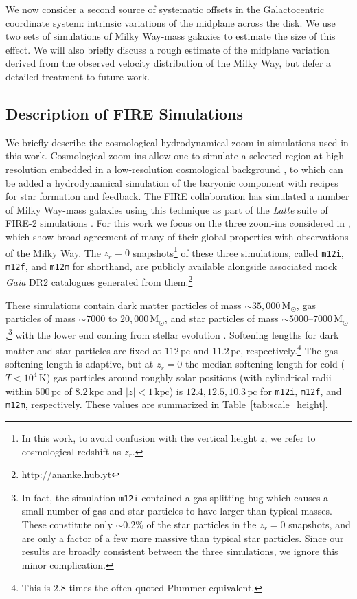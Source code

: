 \documentclass[twocolumn]{aastex62}
\newcommand{\Msun}{\ensuremath{\text{M}_\odot}}
\newcommand{\pc}{\text{pc}}
\newcommand{\kpc}{\text{kpc}}
\newcommand{\mi}{\texttt{m12i}}
\newcommand{\mf}{\texttt{m12f}}
\newcommand{\mm}{\texttt{m12m}}
\newcommand{\abs}[1]{\left| #1 \right|}
\newcommand{\z}{z_r}
\begin{document}
We now consider a second source of systematic offsets in the Galactocentric
coordinate system: intrinsic variations of the midplane across the disk. We
use two sets of simulations of Milky Way-mass galaxies to estimate the size of this effect. We will also
briefly discuss a rough estimate of the midplane variation derived from the
observed velocity distribution of the Milky Way, but defer a detailed
treatment to future work.

\subsection{Description of FIRE Simulations} \label{ssec:cosmozoom}
We briefly describe the cosmological-hydrodynamical zoom-in simulations used
in this work. Cosmological zoom-ins allow one to simulate a selected region at
high resolution embedded in a low-resolution cosmological background
\citep[e.g.][]{1993ApJ...412..455K,2014MNRAS.437.1894O}, to which can be added
a hydrodynamical simulation of the baryonic component with recipes for star
formation and feedback. The FIRE collaboration has simulated a number of Milky
Way-mass galaxies using this technique as part of the {\em Latte} suite of
FIRE-2 simulations \citep{2016ApJ...827L..23W,2018MNRAS.481.4133G}. For this
work we focus on the three zoom-ins considered in \citet{2018arXiv180610564S},
which show broad agreement of many of their global properties with
observations of the Milky Way. The $\z=0$ snapshots\footnote{In this work, to
avoid confusion with the vertical height $z$, we refer to cosmological
redshift as $\z$.} of these three simulations, called \mi{}, \mf{}, and \mm{}
for shorthand, are publicly available alongside associated mock {\em Gaia} DR2
catalogues generated from them.\footnote{\url{http://ananke.hub.yt}}

These simulations contain dark matter particles of mass $\sim35,000\,\Msun$,
gas particles of mass $\sim 7000$ to $20,000\,\Msun$, and star particles
of mass $\sim 5000 \text{--} 7000\,
\Msun$,\footnote{In fact, the simulation \mi{} contained a gas
splitting bug which causes a small number of gas and star particles to have
larger than typical masses. These constitute only $\sim0.2\%$ of the star
particles in the $\z=0$ snapshots, and are only a factor of a few more massive
than typical star particles. Since our results are broadly consistent between
the three simulations, we ignore this minor complication.} with the lower end
coming from stellar evolution \citep{2018arXiv180610564S}. Softening lengths
for dark matter and star particles are fixed at $112\,\pc$ and $11.2\,\pc$,
respectively.\footnote{This is $2.8$ times the often-quoted
Plummer-equivalent.} The gas softening length is adaptive, but at $\z=0$ the
median softening length for cold ($T < 10^4\,\text{K}$) gas particles around
roughly solar positions (with cylindrical radii within $500\,\pc$ of
$8.2\,\kpc$ and $\abs{z}<1\,\kpc$) is $12.4, 12.5, 10.3\,\pc$ for \mi{},
\mf{}, and \mm{}, respectively. These values are summarized in
Table~\ref{tab:scale_height}.
\end{document}
